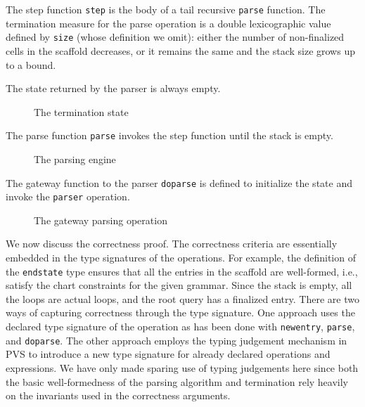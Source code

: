 \documentclass[sigplan,10pt,anonymous,review]{acmart}\settopmatter{printfolios=true,printccs=false,printacmref=false}
\begin{document}
\begin{CCSXML}
The step function \texttt{step} is the body of a tail recursive \texttt{parse} function.  The termination measure for the parse operation is a double lexicographic
value defined by \texttt{size} (whose definition we omit):
either the number of non-finalized cells in the scaffold decreases,
or it remains the same and the stack size grows up to a bound.  

% 

The state returned by the parser is always empty.  
\begin{figure}[h!]
  
    \vspace*{-4mm}
\caption{The termination state}
\label{pvs:endstate}
\end{figure}

The parse function \texttt{parse} invokes the step function until
the stack is empty.  
\begin{figure}[h!]
  
    \vspace*{-4mm}
\caption{The parsing engine}
\label{pvs:parser}
\end{figure}

The gateway function to the parser \texttt{doparse} is defined to initialize
the state and invoke the \texttt{parser} operation\@.
\begin{figure}[h!]
  
    \vspace*{-4mm}
\caption{The gateway parsing operation}
\label{pvs:doparse}
\end{figure}

We now discuss the correctness proof.  The correctness criteria are
essentially embedded in the type signatures of the operations.
For example, the definition of the \texttt{endstate} type ensures that
all the entries in the scaffold are well-formed, i.e., satisfy the chart constraints for the given grammar.   Since the stack is empty, all the loops are actual
loops, and the root query has a finalized entry.  There are two ways of
capturing correctness through the type signature.  One approach uses the declared
type signature of the operation as has been done with \texttt{newentry},  
\texttt{parse}, and \texttt{doparse}\@.  The other approach employs the
typing judgement mechanism in PVS to introduce a new type signature for
already declared operations and expressions.  We have only made sparing
use of typing judgements here since both the basic well-formedness of the
parsing algorithm and termination rely heavily on the invariants used in
the correctness arguments.


\end{CCSXML}
\end{document}
